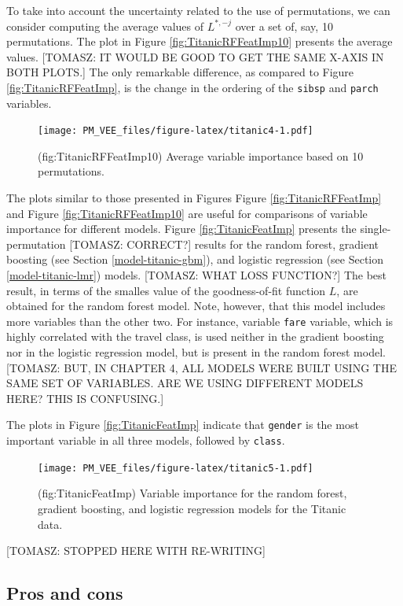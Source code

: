 \documentclass[12pt,]{krantz}
\begin{document}
To take into account the uncertainty related to the use of permutations, we can consider computing the average values of \(L^{*,-j}\) over a set of, say, 10 permutations. The plot in Figure \ref{fig:TitanicRFFeatImp10} presents the average values. {[}TOMASZ: IT WOULD BE GOOD TO GET THE SAME X-AXIS IN BOTH PLOTS.{]} The only remarkable difference, as compared to Figure \ref{fig:TitanicRFFeatImp}, is the change in the ordering of the \texttt{sibsp} and \texttt{parch} variables.

\begin{figure}
\centering
\texttt{[image: PM\_VEE\_files/figure-latex/titanic4-1.pdf]}
\caption{\label{fig:titanic4}(fig:TitanicRFFeatImp10) Average variable importance based on 10 permutations.}
\end{figure}

The plots similar to those presented in Figures Figure \ref{fig:TitanicRFFeatImp} and Figure \ref{fig:TitanicRFFeatImp10} are useful for comparisons of variable importance for different models.
Figure \ref{fig:TitanicFeatImp} presents the single-permutation {[}TOMASZ: CORRECT?{]} results for the random forest, gradient boosting (see Section \ref{model-titanic-gbm}), and logistic regression (see Section \ref{model-titanic-lmr}) models. {[}TOMASZ: WHAT LOSS FUNCTION?{]} The best result, in terms of the smalles value of the goodness-of-fit function \(L\), are obtained for the random forest model. Note, however, that this model includes more variables than the other two. For instance, variable \texttt{fare} variable, which is highly correlated with the travel class, is used neither in the gradient boosting nor in the logistic regression model, but is present in the random forest model. {[}TOMASZ: BUT, IN CHAPTER 4, ALL MODELS WERE BUILT USING THE SAME SET OF VARIABLES. ARE WE USING DIFFERENT MODELS HERE? THIS IS CONFUSING.{]}

The plots in Figure \ref{fig:TitanicFeatImp} indicate that \texttt{gender} is the most important variable in all three models, followed by \texttt{class}.

\begin{figure}
\centering
\texttt{[image: PM\_VEE\_files/figure-latex/titanic5-1.pdf]}
\caption{\label{fig:titanic5}(fig:TitanicFeatImp) Variable importance for the random forest, gradient boosting, and logistic regression models for the Titanic data.}
\end{figure}

{[}TOMASZ: STOPPED HERE WITH RE-WRITING{]}

\hypertarget{featureImportanceProsCons}{%
\subsection{Pros and cons}\label{featureImportanceProsCons}}
\end{document}
